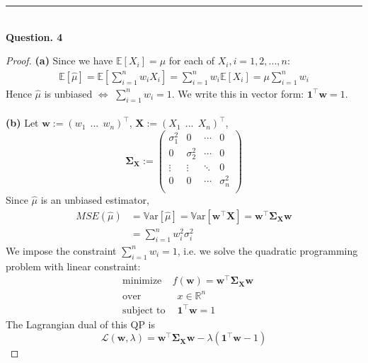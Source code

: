 \documentclass[a4paper, 10pt]{article}
\theoremstyle{definition}
\theoremstyle{hSol}
\begin{document}
\noindent\rule{16cm}{0.4pt}
~\\
\textbf{Question. 4}
\begin{proof} \textbf{(a)} Since we have $\mathbb{E}\left[X_i\right] = \mu$ for each of $X_i, i=1,2,...,n$:
\begin{equation}
  \begin{split}
    \mathbb{E}\left[\hat{\mu}\right] = \mathbb{E}\left[\sum_{i=1}^n w_i X_i\right] = \sum_{i=1}^n w_i \mathbb{E}\left[X_i\right] = \mu \sum_{i=1}^n w_i
  \end{split}
\end{equation}
Hence $\hat{\mu}$ is unbiased $\iff$ $\sum_{i=1}^n w_i=1$. We write this in vector form: $\bm{1}^{\top} \bm{w} = 1$.\\
~\\
\textbf{(b)} Let $\bm{w}:=(w_1~~...~~w_n)^{\top}$, $\bm{X}:=(X_1~~...~~X_n)^{\top}$, 
$$ \bm{\Sigma}_{\bm{X}} := 
\begin{pmatrix}
  \sigma^2_1 & 0 & \cdots & 0\\
  0 & \sigma^2_2 & \cdots & 0\\
  \vdots & \vdots& \ddots & 0\\
  0 & 0 & \cdots & \sigma^2_n\\
\end{pmatrix}
$$ 
Since $\hat{\mu}$ is an unbiased estimator,
\begin{equation}
\begin{split}
  MSE(\hat{\mu}) &= \mathrm{\mathbb{V}ar}[\hat{\mu}] = \mathrm{\mathbb{V}ar}[\bm{w}^{\top} \bm{X}] = \bm{w}^{\top} \bm{\Sigma}_{\bm{X}} \bm{w} \\ 
  &= \sum_{i=1}^n w_i^2 \sigma^2_i
\end{split}
\end{equation}
We impose the constraint $\sum_{i=1}^n w_i = 1$, i.e. we solve the quadratic programming problem with linear constraint:
\begin{equation}
  \begin{split}
      &\text{minimize}~~~~~f(\bm{w}) =\bm{w}^{\top} \bm{\Sigma}_{\bm{X}} \bm{w}\\
      &\text{over}\quad\qquad~~~x\in\mathbb{R}^n\\
      &\text{subject to}\quad~ \bm{1}^{\top} \bm{w} = 1
  \end{split}
\end{equation}
The Lagrangian dual of this QP is
\begin{equation}
  \mathcal{L}(\bm{w}, \lambda) = \bm{w}^{\top} \bm{\Sigma}_{\bm{X}} \bm{w} - \lambda(\bm{1}^{\top} \bm{w}-1)

\end{equation}
\end{proof}
\end{document}
